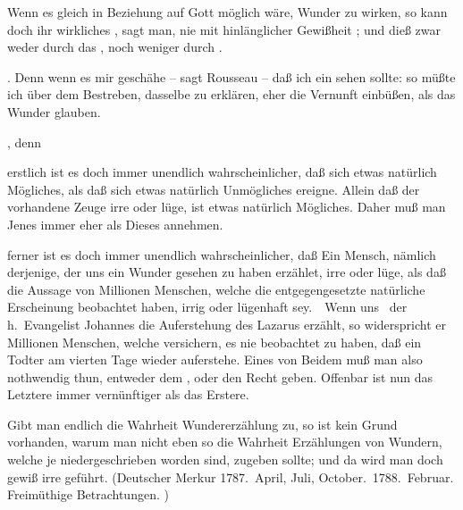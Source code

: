 Wenn es gleich in Beziehung auf Gott möglich wäre, Wunder zu wirken, so kann doch ihr wirkliches , sagt man, nie mit hinlänglicher Gewißheit ; und dieß zwar weder durch das , noch weniger durch .
\begin{aufzb}
\item {}. Denn wenn es mir geschähe -- sagt Rousseau -- daß ich ein  sehen sollte: so müßte ich über dem Bestreben, dasselbe  zu erklären, eher die  Vernunft einbüßen, als das Wunder glauben.
\item {}, denn
\begin{aufzc}
\item erstlich ist es doch immer unendlich wahrscheinlicher, daß sich etwas natürlich Mögliches, als daß sich etwas natürlich Unmögliches ereigne. Allein daß der vorhandene Zeuge irre oder lüge, ist etwas natürlich Mögliches. Daher muß man Jenes immer eher als Dieses annehmen.
\item ferner ist es doch immer unendlich wahrscheinlicher, daß Ein Mensch, nämlich derjenige, der uns ein Wunder gesehen zu haben erzählet, irre oder lüge, als daß die Aussage von Millionen Menschen, welche die entgegengesetzte natürliche Erscheinung beobachtet haben, irrig oder lügenhaft sey.~\ Wenn uns \zB\ der h.~Evangelist Johannes die Auferstehung des Lazarus erzählt, so widerspricht er Millionen Menschen, welche versichern, es nie beobachtet zu haben, daß ein Todter am vierten Tage wieder auferstehe. Eines von Beidem muß man also nothwendig thun, entweder dem , oder den  Recht geben. Offenbar ist nun das Letztere immer vernünftiger als das Erstere.
\item Gibt man endlich die Wahrheit  Wundererzählung zu, so ist kein Grund vorhanden, warum man nicht eben so die Wahrheit  Erzählungen von Wundern, welche je niedergeschrieben worden sind, zugeben sollte; und da wird man doch gewiß irre geführt. (Deutscher Merkur 1787.\ April, Juli, October.\ 1788.\ Februar. Freimüthige Betrachtungen.  \uA )
\end{aufzc}
\end{aufzb}\par
